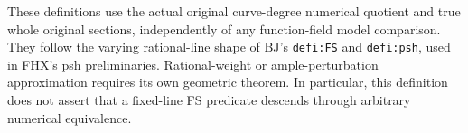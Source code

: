 \begin{remark}
These definitions use the actual original curve-degree numerical quotient
and true whole original sections, independently of any function-field
model comparison. They follow the varying rational-line shape of BJ's
\texttt{defi:FS} and \texttt{defi:psh}, used in FHX's psh preliminaries.
Rational-weight or ample-perturbation approximation requires its own
geometric theorem. In particular, this definition does not assert that a
fixed-line FS predicate descends through arbitrary numerical equivalence.
\end{remark}
